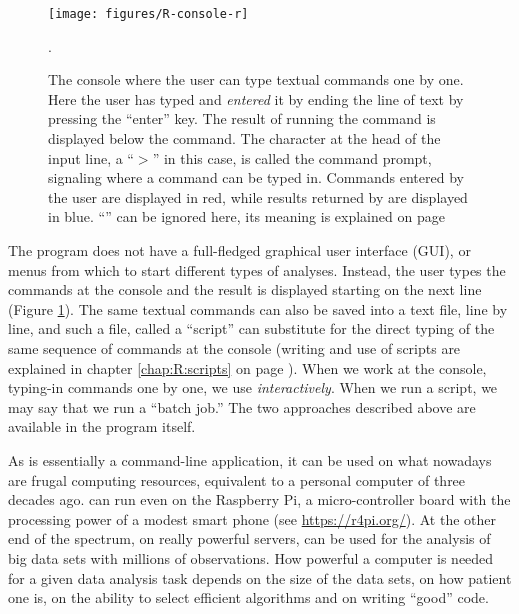\documentclass[krantz2]{krantz}\usepackage{knitr}
\begin{document}
\begin{figure}
  \centering
  \texttt{[image: figures/R-console-r]}
  \caption[The R console]{The \Rpgrm console where the user can type textual commands one by one. Here the user has typed  and \textit{entered} it by ending the line of text by pressing the ``enter'' key. The result of running the command is displayed below the command. The character at the head of the input line, a ``$>$'' in this case, is called the command prompt, signaling where a command can be typed in. Commands entered by the user are displayed in red, while results returned by \Rlang are displayed in blue. ``\code{[1]}'' can be ignored here, its meaning is explained on page \pageref{par:print:vec:index}}.\label{fig:intro:console}
\end{figure}

The \Rpgrm program does not have a full-fledged graphical user interface (GUI), or menus from which to start different types of analyses. Instead, the user types the commands at the \Rpgrm console and the result is displayed starting on the next line (Figure \ref{fig:intro:console}). The same textual commands can also be saved into a text file, line by line, and such a file, called a ``script'' can substitute for the direct typing of the same sequence of commands at the console (writing and use of \Rlang scripts are explained in chapter \ref{chap:R:scripts} on page \pageref{chap:R:scripts}). When we work at the console, typing-in commands one by one, we use \Rlang \emph{interactively}. When we run a script, we may say that we run a ``batch job.'' The two approaches described above are available in the \Rpgrm program itself.

\begin{explainbox}
As \Rpgrm is essentially a command-line application, it can be used on what nowadays are frugal computing resources, equivalent to a personal computer of three decades ago. \Rpgrm can run even on the Raspberry Pi, a micro-controller board with the processing power of a modest smart phone (see \url{https://r4pi.org/}). At the other end of the spectrum, on really powerful servers, \Rpgrm can be used for the analysis of big data sets with millions of observations. How powerful a computer is needed for a given data analysis task depends on the size of the data sets, on how patient one is, on the ability to select efficient algorithms and on writing ``good'' code.
\end{explainbox}
\end{document}
